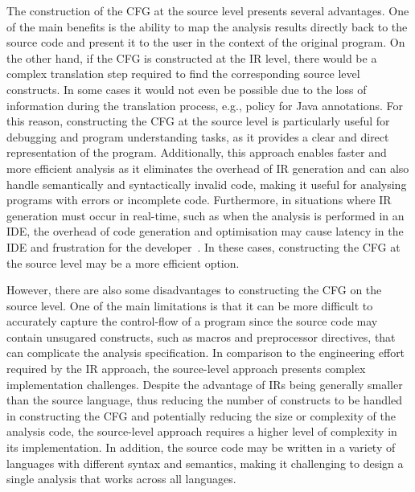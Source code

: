 The construction of the CFG at the source level presents several advantages. One of the
main benefits is the ability to map the analysis results directly back to the source code
and present it to the user in the context of the original program. On the other hand,
if the CFG is constructed at the IR level, there would be a complex translation step
required to find the corresponding source level constructs. In some cases it would
not even be possible due to the loss of information during the translation process, e.g.,
 policy for Java annotations.
For this reason, constructing the CFG at the source level is particularly useful for
debugging and program understanding tasks, as it provides a clear and direct
representation of the program. Additionally, this approach enables faster and
more efficient analysis as it eliminates the overhead of IR generation and can
also handle semantically and syntactically invalid code, making it useful for
analysing programs with errors or incomplete code. Furthermore, in situations where
IR generation must occur in real-time, such as when the analysis is performed in an
IDE, the overhead of code generation and optimisation may cause latency in the IDE and frustration for the developer~\cite{piskachev2022far}.
In these cases, constructing the CFG at the source level may be a more efficient option.

However, there are also some disadvantages to constructing the CFG on the source level.
One of the main limitations is that it can be more difficult to accurately capture the
control-flow of a program since the source code may contain unsugared constructs,
such as macros and preprocessor directives, that
can complicate the analysis specification.
In comparison to the engineering effort required by the IR approach, the source-level
approach presents complex implementation challenges. Despite the advantage
of IRs being generally smaller than the source language, thus reducing the number
of constructs to be handled in constructing the CFG and potentially reducing
the size or complexity of the analysis code, the source-level approach requires
a higher level of complexity in its implementation.
In addition, the source code may be written in a variety
of languages with different syntax and semantics, making it challenging to
design a single analysis that works across all languages.


